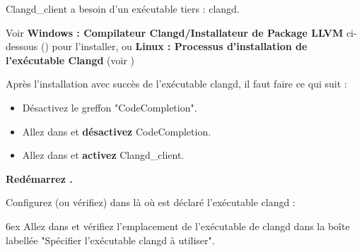 Clangd\_client a besoin d'un exécutable tiers : clangd.

Voir \textbf{Windows : Compilateur Clangd/Installateur de Package LLVM} ci-dessous () pour l'installer, ou \textbf{Linux : Processus d'installation de l'exécutable Clangd} (voir )

Après l'installation avec succès de l'exécutable clangd, il faut faire ce qui suit :

\begin{itemize}[noitemsep]
\item Désactivez le greffon "CodeCompletion".
\item Allez dans  et \textbf{désactivez} CodeCompletion.
\item Allez dans  et \textbf{activez} Clangd\_client.
\end{itemize}
\textbf{Redémarrez \codeblocks.}

Configurez (ou vérifiez) dans \codeblocks là où est déclaré l'exécutable clangd :\par
\begingroup
\leftskip 6ex
Allez dans  et vérifiez l'emplacement de l'exécutable de clangd dans la boîte labellée "Spécifier l'exécutable clangd à utiliser".
\par
\endgroup

